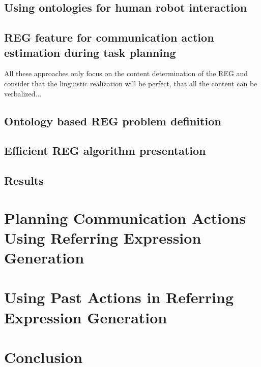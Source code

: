 \documentclass[a4paper,11pt,twoside]{StyleThese}
\begin{document}
\subsection{Using ontologies for human robot interaction}

\subsection{REG feature for communication action estimation during task planning}
All these approaches only focus on the content determination of the REG and consider that the linguistic realization will be perfect, that all the content can be verbalized...

\subsection{Ontology based REG problem definition}

\subsection{Efficient REG algorithm presentation}

\subsection{Results}

\section{Planning Communication Actions Using Referring Expression Generation}



\section{Using Past Actions in Referring Expression Generation}

\section{Conclusion}

\ifdefined{}
\else


\end{document}
